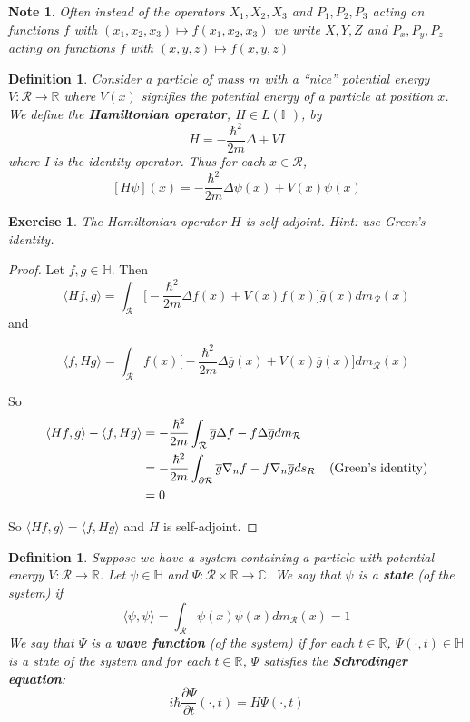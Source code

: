 \documentclass[12pt]{amsart}
\newtheorem{defn}[thm]{Definition}
\newtheorem{note}[thm]{Note}
\newtheorem{ex}[thm]{Exercise}
\renewcommand{\r}{\rangle}
\renewcommand{\l}{\langle}
\newcommand{\Del}{\Delta}
\newcommand{\C}{\mathbb{C}}
\renewcommand{\H}{\mathbb{H}}
\newcommand{\R}{\mathbb{R}}
\renewcommand{\MR}{\mathcal{R}}
\begin{document}
\begin{note}
Often instead of the operators $X_1, X_2, X_3$ and $P_1, P_2, P_3$ acting on functions $f$ with $(x_1, x_2, x_3) \mapsto f(x_1, x_2, x_3)$ we write $X,Y,Z$ and $P_x,P_y,P_z$ acting on functions $f$ with $(x,y,z) \mapsto f(x,y,z)$
\end{note}

\begin{defn} 
Consider a particle of mass $m$ with a ``nice'' potential energy $V: \MR \rightarrow \R$ where $V(x)$ signifies the potential energy of a particle at position $x$. We define the \textbf{Hamiltonian operator}, $H \in L(\H)$, by $$H = -\frac{\hbar^2}{2m} \Delta+VI$$ where I is the identity operator. Thus for each $x \in \MR$, $$[H \psi](x) = -\frac{\hbar^2}{2m} \Delta\psi(x) +V(x)\psi(x)$$  
\end{defn} 

\begin{ex}
The Hamiltonian operator $H$ is self-adjoint. Hint: use Green's identity.
\end{ex}

\begin{proof} Let $f, g \in \H$. Then $$\l H f, g \r = \int_{\MR} \bigg[-\frac{\hbar^2}{2m} \Delta f(x) +V(x)f(x) \bigg] \overline{g}(x) dm_{\MR}(x)$$ and 

$$\l  f, Hg \r = \int_{\MR} f(x) \bigg[- \frac{\hbar^2}{2m} \Delta \overline{g}(x) +V(x)\overline{g}(x) \bigg]  dm_{\MR}(x)$$

So 
\begin{align*}
\l H f, g \r  - \l  f, Hg \r 
&= -\frac{\hbar^2}{2m} \int_{\MR} \overline{g} \Del f  - f \Del \overline{g}dm_{\MR}\\
&= - \frac{\hbar^2}{2m} \int_{\partial \MR} \overline{g}\nabla_{n}f - f \nabla_{n}\overline{g} ds_{R} \hspace {4mm}\text{(Green's identity)}\\
&= 0
\end{align*}

So $\l Hf, g \r = \l f, Hg\r$ and $H$ is self-adjoint.
\end{proof}

\begin{defn}
Suppose we have a system containing a particle with potential energy $V: \MR \rightarrow \R$. Let $\psi \in \H$ and $\Psi:\MR \times \R \rightarrow \C$. We say that $\psi$ is a \textbf{state} (of the system) if$$\l \psi, \psi \r = \int_{\MR} \psi(x) \overline{\psi(x)} dm_{\MR}(x) = 1$$ We say that $\Psi$ is a \textbf{wave function} (of the system) if for each $t \in \R$, $\Psi(\cdot, t) \in \H $ is a state of the system and for each $t \in \R$, $\Psi$ satisfies the \textbf{Schrodinger equation}: $$i\hbar \frac{\partial \Psi}{\partial t}(\cdot, t) = H\Psi(\cdot, t)$$
\end{defn}
\end{document}
